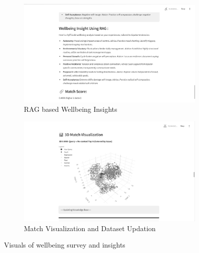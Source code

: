 \begin{figure}[H]
    \begin{subfigure}[b]{0.495\textwidth}
        \centering
        \includegraphics[width=\textwidth]{App Images/34 Interface.png}
        \caption{RAG based Wellbeing Insights}
        \label{fig:wellbeing_questions}
    \end{subfigure}
    \hfill
    \begin{subfigure}[b]{0.495\textwidth}
        \centering
        \includegraphics[width=\textwidth]{App Images/35 Interface.png}
        \caption{Match Visualization and Dataset Updation}
        \label{fig:wellbeing_result}
    \end{subfigure}

    \caption{Visuals of wellbeing survey and insights}
    \label{fig:wellbeing_comparison}
\end{figure}


\pagebreak
